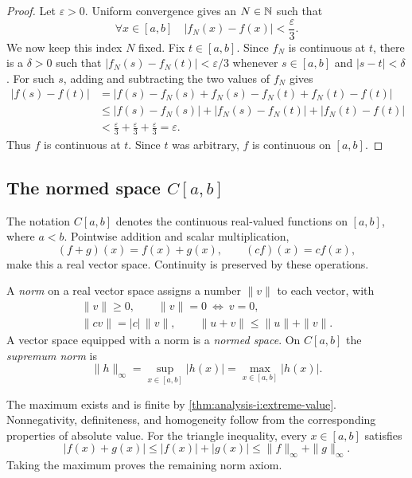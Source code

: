 \begin{proof}
  Let $\varepsilon>0$. Uniform convergence gives an $N\in\mathbb{N}$ such that
  \[
    \forall x\in[a,b]\quad
    |f_N(x)-f(x)|<\frac{\varepsilon}{3}.
  \]
  We now keep this index $N$ fixed.
  Fix $t\in[a,b]$. Since $f_N$ is continuous at $t$,
    there is a $\delta>0$ such that
    $|f_N(s)-f_N(t)|<\varepsilon/3$ whenever $s\in[a,b]$ and
    $|s-t|<\delta$.
  For such $s$, adding and subtracting the two values of $f_N$ gives
  \begin{align*}
    |f(s)-f(t)|
      &=\bigl|f(s)-f_N(s)+f_N(s)-f_N(t)+f_N(t)-f(t)\bigr|\\
      &\le |f(s)-f_N(s)|
        \mathbin{+}|f_N(s)-f_N(t)|
        +|f_N(t)-f(t)|\\
      &<\frac{\varepsilon}{3}+\frac{\varepsilon}{3}
        +\frac{\varepsilon}{3}
       =\varepsilon.
  \end{align*}
  Thus $f$ is continuous at $t$.
  Since $t$ was arbitrary, $f$ is continuous on $[a,b]$.
\end{proof}



\subsection{The normed space \texorpdfstring{$C[a,b]$}{C[a,b]}}

The notation $C[a,b]$ denotes the continuous real-valued functions on
$[a,b]$, where $a<b$. Pointwise addition and scalar multiplication,
\[
  (f+g)(x)=f(x)+g(x),\qquad (cf)(x)=cf(x),
\]
make this a real vector space. Continuity is preserved by these
operations.

\begin{definition}
  \label{thm:analysis-i:supremum-norm}
  A \emph{norm} on a real vector space assigns a number $\|v\|$ to each
  vector, with
  \[
    \begin{gathered}
      \|v\|\ge0,\qquad \|v\|=0\ \Longleftrightarrow\ v=0,\\
      \|cv\|=|c|\,\|v\|,\qquad
      \|u+v\|\le\|u\|+\|v\|.
    \end{gathered}
  \]
  A vector space equipped with a norm is a \emph{normed space}.
  On $C[a,b]$ the \emph{supremum norm} is
  \[
    \|h\|_\infty=\sup_{x\in[a,b]}|h(x)|
      =\max_{x\in[a,b]}|h(x)|.
  \]
\end{definition}

The maximum exists and is finite by
\autoref{thm:analysis-i:extreme-value}. Nonnegativity, definiteness,
and homogeneity follow from the corresponding properties of absolute
value. For the triangle inequality, every $x\in[a,b]$ satisfies
\[
  |f(x)+g(x)|\le |f(x)|+|g(x)|
    \le\|f\|_\infty+\|g\|_\infty.
\]
Taking the maximum proves the remaining norm axiom.

